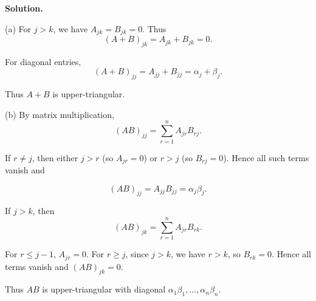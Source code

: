 \documentclass[11pt]{article}
\newcommand{\SolutionAnnounce}{\noindent\textbf{Solution.}\par\medskip}
\begin{document}
\begin{solutionBox}
\SolutionAnnounce
\doublespacing

(a) For $j>k$, we have $A_{jk}=B_{jk}=0$.
Thus
\[
(A+B)_{jk}=A_{jk}+B_{jk}=0.
\]

For diagonal entries,
\[
(A+B)_{jj}=A_{jj}+B_{jj}=\alpha_j+\beta_j.
\]

Thus $A+B$ is upper-triangular.

(b) By matrix multiplication,
\[
(AB)_{jj}=\sum_{r=1}^n A_{jr}B_{rj}.
\]

If $r\neq j$, then either $j>r$ (so $A_{jr}=0$)
or $r>j$ (so $B_{rj}=0$).
Hence all such terms vanish and

\[
(AB)_{jj}=A_{jj}B_{jj}=\alpha_j\beta_j.
\]

If $j>k$, then
\[
(AB)_{jk}=\sum_{r=1}^n A_{jr}B_{rk}.
\]

For $r\le j-1$, $A_{jr}=0$.
For $r\ge j$, since $j>k$, we have $r>k$,
so $B_{rk}=0$.
Hence all terms vanish and $(AB)_{jk}=0$.

Thus $AB$ is upper-triangular with diagonal
$\alpha_1\beta_1,\dots,\alpha_n\beta_n$.

\end{solutionBox}
\end{document}
